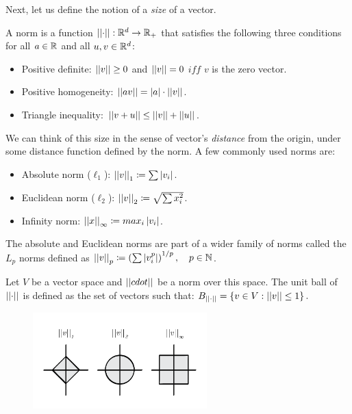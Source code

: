 Next, let us define the notion of a \textit{size} of a vector.
\begin{definition}[Norm] 
	A norm is a function $\left|\left| \cdot\right|\right|:\mathbb{R}^d \rightarrow \mathbb{R}_+$ that satisfies the following three conditions for all $a \in \mathbb{R}$ and all $u, v \in \mathbb{R}^d$:
	\begin{itemize}
		\item Positive definite: $\left|\left| v\right|\right| \ge 0$ and $\left|\left| v\right|\right| = 0$ $iff$ $v$ is the zero vector.
		\item Positive homogeneity: $\left|\left| av\right|\right| = \left|a\right|\cdot \left|\left| v\right|\right|$.
		\item Triangle inequality: $\left|\left| v+u\right|\right| \leq \left|\left| v\right|\right| + \left|\left| u\right|\right|$.
	\end{itemize}
\end{definition}
We can think of this size in the sense of vector's \textit{distance} from the origin, under some distance function defined by the norm. A few commonly used norms are:
\begin{itemize}
	\item Absolute norm ($\ell_1$): $\left|\left| v\right|\right|_1 \coloneqq \sum\left|v_i\right|$.
	\item Euclidean norm ($\ell_2$): $\left|\left| v\right|\right|_2 \coloneqq \sqrt{\sum x_i^2}$.
	\item Infinity norm: $\left|\left| x\right|\right|_\infty \coloneqq max_i \left|v_i\right|$.
\end{itemize}
\begin{remark}
The absolute and Euclidean norms are part of a wider family of norms called the $L_p$ norms defined as $\left|\left| v\right|\right|_p \coloneqq \left(\sum\left|v_i^p\right|\right)^{1/p},\quad p\in\mathbb{N}$.
\end{remark}

\begin{definition}
	Let $V$ be a vector space and $\left|\left| cdot\right|\right|$ be a norm over this space. The unit ball of $\left|\left| \cdot\right|\right|$ is defined as the set of vectors such that:  $B_{\left|\left| \cdot\right|\right|} = \left\{v\in V: \left|\left| v\right|\right| \leq 1\right\}.$
\end{definition} 

\begin{figure}[H]
	\centering
	\includegraphics[width=0.6\textwidth]{chapters/mathematical.basis/figures/1_1.png}  
\end{figure}

